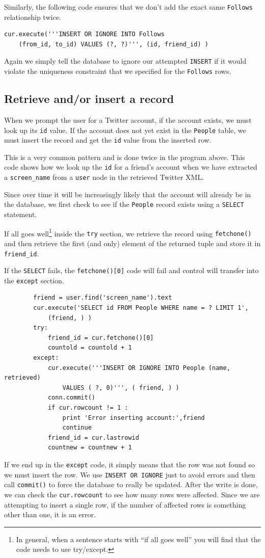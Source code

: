 \documentclass[10pt]{book}
\begin{document}
Similarly, the following code ensures that we don't add the 
exact same {\tt Follows} relationship twice.

\beforeverb
\begin{verbatim}
cur.execute('''INSERT OR IGNORE INTO Follows 
    (from_id, to_id) VALUES (?, ?)''', (id, friend_id) )
\end{verbatim}
\afterverb
%
Again we simply tell the database to ignore our attempted 
{\tt INSERT} if it would violate the uniqueness constraint
that we specified for the {\tt Follows} rows.

\subsection{Retrieve and/or insert a record}

When we prompt the user for a Twitter account, if the account 
exists, we must look up its {\tt id} value.  If the account
does not yet exist in the {\tt People} table, we must insert 
the record and get the {\tt id} value from the inserted
row.

This is a very common pattern and is done twice in the program above.
This code shows how we look up the {\tt id} for a 
friend's account when we have extracted a \verb"screen_name"
from a {\tt user} node in the retrieved Twitter XML.

Since over time it will be increasingly likely that the account
will already be in the database, we first check to see if the
{\tt People} record exists using a {\tt SELECT} statement.

If all goes well\footnote{In general, when a sentence starts 
with ``if all goes well'' you will find that the code needs
to use try/except.} inside the {\tt try} section, we retrieve the
record using {\tt fetchone()} and then retrieve the
first (and only) element of the returned tuple and store it in 
\verb"friend_id".

If the {\tt SELECT} fails, the {\tt fetchone()[0]} code will fail
and control will transfer into the {\tt except} section.

\beforeverb
\begin{verbatim}
        friend = user.find('screen_name').text
        cur.execute('SELECT id FROM People WHERE name = ? LIMIT 1',
            (friend, ) )
        try:
            friend_id = cur.fetchone()[0]
            countold = countold + 1
        except:
            cur.execute('''INSERT OR IGNORE INTO People (name, retrieved) 
                VALUES ( ?, 0)''', ( friend, ) )
            conn.commit()
            if cur.rowcount != 1 :
                print 'Error inserting account:',friend
                continue
            friend_id = cur.lastrowid
            countnew = countnew + 1
\end{verbatim}
\afterverb
%
If we end up in the {\tt except} code, it simply means that the row
was not found so we must insert the row.  We use {\tt INSERT OR 
IGNORE} just to avoid errors and then call {\tt commit()} to 
force the database to really be updated.  After the write is done, we can 
check the {\tt cur.rowcount} to see how many rows were affected.  Since
we are attempting to insert a single row, if the number of 
affected rows is something other than one, it is an error.  
\end{document}

